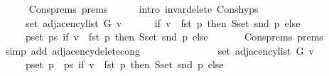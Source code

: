 \begin{isabellebody}
\ \ \ \ \isamarkupfalse%
\ Cons{\isachardot}{\kern0pt}prems{\isacharparenleft}{\kern0pt}{}{\isacharparenright}{\kern0pt}\ prems\isanewline
\ \ \ \ \isamarkupfalse%
\ {\isacharparenleft}{\kern0pt}intro\ invar{\isacharunderscore}{\kern0pt}delete{\isacharunderscore}{\kern0pt}{}\ Cons{\isachardot}{\kern0pt}hyps{\isacharparenright}{\kern0pt}\isanewline
\ \ \isamarkupfalse%
\ \isamarkupfalse%
\isanewline
\ \ \ \ {\isachardoublequoteopen}{\isachardot}{\kern0pt}{\isachardot}{\kern0pt}{\isachardot}{\kern0pt}\ {\isacharequal}{\kern0pt}\isanewline
\ \ \ \ \ set\ {\isacharparenleft}{\kern0pt}adjacency{\isacharunderscore}{\kern0pt}list\ G\ v{\isacharparenright}{\kern0pt}\ {\isacharminus}{\kern0pt}\isanewline
\ \ \ \ \ {\isacharparenleft}{\kern0pt}if\ v\ {\isacharequal}{\kern0pt}\ fst\ p\ then\ S{\isachardot}{\kern0pt}set\ {\isacharparenleft}{\kern0pt}snd\ p{\isacharparenright}{\kern0pt}\ else\ {\isacharbraceleft}{\kern0pt}{\isacharbraceright}{\kern0pt}{\isacharparenright}{\kern0pt}\ {\isacharminus}{\kern0pt}\isanewline
\ \ \ \ \ {\isacharparenleft}{\kern0pt}{\isasymUnion}p{\isasymin}set\ ps{\isachardot}{\kern0pt}\ if\ v\ {\isacharequal}{\kern0pt}\ fst\ p\ then\ S{\isachardot}{\kern0pt}set\ {\isacharparenleft}{\kern0pt}snd\ p{\isacharparenright}{\kern0pt}\ else\ {\isacharbraceleft}{\kern0pt}{\isacharbraceright}{\kern0pt}{\isacharparenright}{\kern0pt}{\isachardoublequoteclose}\isanewline
\ \ \ \ \isamarkupfalse%
\ Cons{\isachardot}{\kern0pt}prems{\isacharparenleft}{\kern0pt}{}{\isacharparenright}{\kern0pt}\ prems{\isacharparenleft}{\kern0pt}{}{\isacharparenright}{\kern0pt}\isanewline
\ \ \ \ \isamarkupfalse%
\ {\isacharparenleft}{\kern0pt}simp\ add{\isacharcolon}{\kern0pt}\ adjacency{\isacharunderscore}{\kern0pt}delete{\isacharunderscore}{\kern0pt}{}{\isacharunderscore}{\kern0pt}cong{\isacharparenright}{\kern0pt}\isanewline
\ \ \isamarkupfalse%
\ \isamarkupfalse%
\isanewline
\ \ \ \ {\isachardoublequoteopen}{\isachardot}{\kern0pt}{\isachardot}{\kern0pt}{\isachardot}{\kern0pt}\ {\isacharequal}{\kern0pt}\isanewline
\ \ \ \ \ set\ {\isacharparenleft}{\kern0pt}adjacency{\isacharunderscore}{\kern0pt}list\ G\ v{\isacharparenright}{\kern0pt}\ {\isacharminus}{\kern0pt}\isanewline
\ \ \ \ \ {\isacharparenleft}{\kern0pt}{\isasymUnion}p{\isasymin}set\ {\isacharparenleft}{\kern0pt}p\ {\isacharhash}{\kern0pt}\ ps{\isacharparenright}{\kern0pt}{\isachardot}{\kern0pt}\ if\ v\ {\isacharequal}{\kern0pt}\ fst\ p\ then\ S{\isachardot}{\kern0pt}set\ {\isacharparenleft}{\kern0pt}snd\ p{\isacharparenright}{\kern0pt}\ else\ {\isacharbraceleft}{\kern0pt}{\isacharbraceright}{\kern0pt}{\isacharparenright}{\kern0pt}{\isachardoublequoteclose}\isanewline

\end{isabellebody}

